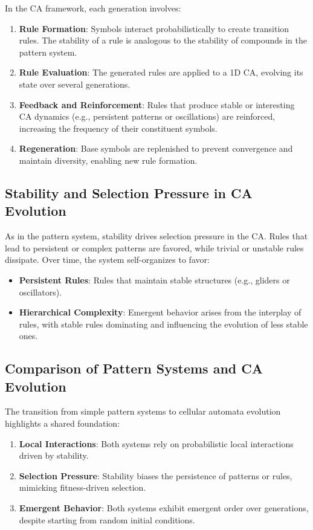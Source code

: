 \documentclass[entropy,article,submit,pdftex,moreauthors]{Definitions/mdpi}
\begin{document}
In the CA framework, each generation involves:
\begin{enumerate}
    \item \textbf{Rule Formation}: Symbols interact probabilistically to create transition rules. The stability of a rule is analogous to the stability of compounds in the pattern system.
    \item \textbf{Rule Evaluation}: The generated rules are applied to a 1D CA, evolving its state over several generations.
    \item \textbf{Feedback and Reinforcement}: Rules that produce stable or interesting CA dynamics (e.g., persistent patterns or oscillations) are reinforced, increasing the frequency of their constituent symbols.
    \item \textbf{Regeneration}: Base symbols are replenished to prevent convergence and maintain diversity, enabling new rule formation.
\end{enumerate}

\subsection{Stability and Selection Pressure in CA Evolution}

As in the pattern system, stability drives selection pressure in the CA. Rules that lead to persistent or complex patterns are favored, while trivial or unstable rules dissipate. Over time, the system self-organizes to favor:
\begin{itemize}
    \item \textbf{Persistent Rules}: Rules that maintain stable structures (e.g., gliders or oscillators).
    \item \textbf{Hierarchical Complexity}: Emergent behavior arises from the interplay of rules, with stable rules dominating and influencing the evolution of less stable ones.
\end{itemize}

\subsection{Comparison of Pattern Systems and CA Evolution}

The transition from simple pattern systems to cellular automata evolution highlights a shared foundation:
\begin{enumerate}
    \item \textbf{Local Interactions}: Both systems rely on probabilistic local interactions driven by stability.
    \item \textbf{Selection Pressure}: Stability biases the persistence of patterns or rules, mimicking fitness-driven selection.
    \item \textbf{Emergent Behavior}: Both systems exhibit emergent order over generations, despite starting from random initial conditions.
\end{enumerate}
\end{document}
